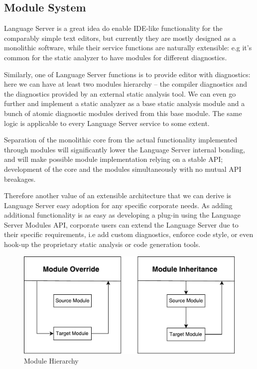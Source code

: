 \subsection{Module System}
\label{sec:met:arch:ms}

Language Server is a great idea do enable IDE-like functionality for
the comparably simple text editors, but currently they are mostly designed as 
a monolithic software, while their service functions are naturally extensible: 
e.g it's common for the static analyzer to have modules for different diagnostics.

Similarly, one of Language Server functions is to provide editor with diagnostics: here we can 
have at least two modules hierarchy -- the compiler diagnostics and the diagnostics provided by an external static analysis tool.
We can even go further and implement a static analyzer as a base static analysis module and a bunch of atomic diagnostic modules derived 
from this base module. 
The same logic is applicable to every Language Server service to some extent.

Separation of the monolithic core from the actual functionality implemented through modules
will significantly lower the Language Server internal bonding, and will make possible
module implementation relying on a stable API; development of the core and the modules
simultaneously with no mutual API breakages.

Therefore another value of an extensible architecture that we can derive is 
Language Server easy adoption for any specific corporate needs. 
As adding additional functionality is as easy as developing a plug-in using 
the Language Server Modules API, corporate users can extend the Language Server 
due to their specific requirements, i.e add custom diagnostics, enforce code style, 
or even hook-up the proprietary static analysis or code generation tools.

\begin{figure}[H]
    \centering
    \includegraphics[width=.7\textwidth]{figs/module_hierarchy.pdf}
    \caption{Module Hierarchy}
\end{figure}

